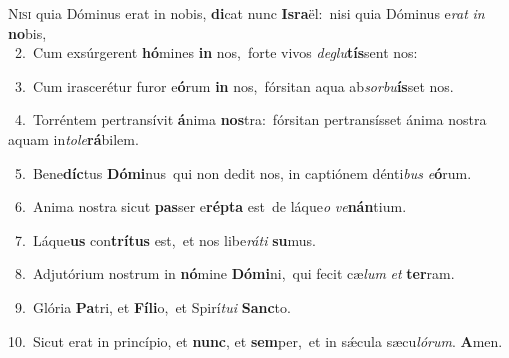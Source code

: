 \lettrine{\initial\textcolor{\initialcolor}{N}}{isi} quia Dóminus erat in nobis, \textbf{di}\-cat nunc \textbf{Is}\-\textbf{ra}ël:~\star nisi quia Dóminus e\textit{rat} \textit{in} \textbf{no}\-bis,\\
{\numbfont\textcolor{\numbcolor}{~2.}}~Cum exsúrgerent \textbf{hó}\-mines \textbf{in} nos,~\star forte vivos \textit{de}\-\textit{glu}\textbf{tís}sent nos:\par
{\numbfont\textcolor{\numbcolor}{~3.}}~Cum irascerétur furor e\-\textbf{ó}\-rum \textbf{in} nos,~\star fórsitan aqua ab\-\textit{sor}\-\textit{bu}\textbf{ís}set nos.\par
{\numbfont\textcolor{\numbcolor}{~4.}}~Torréntem pertransívit \textbf{á}\-nima \textbf{nos}\-tra:~\star fórsitan pertransísset ánima nostra aquam in\-\textit{to}\-\textit{le}\textbf{rá}bilem.\par
{\numbfont\textcolor{\numbcolor}{~5.}}~Bene\-\textbf{díc}\-tus \textbf{Dó}\-\textbf{mi}nus~\star qui non dedit nos, in captiónem dénti\textit{bus} \textit{e}\-\textbf{ó}rum.\par
{\numbfont\textcolor{\numbcolor}{~6.}}~Anima nostra sicut \textbf{pas}\-ser e\-\textbf{rép}\-\textbf{ta} est~\star de láque\textit{o} \textit{ve}\-\textbf{nán}tium.\par
{\numbfont\textcolor{\numbcolor}{~7.}}~Láque\textbf{us} con\-\textbf{trí}\-\textbf{tus} est,~\star et nos libe\-\textit{rá}\-\textit{ti} \textbf{su}\-mus.\par
{\numbfont\textcolor{\numbcolor}{~8.}}~Adjutórium nostrum in \textbf{nó}\-mine \textbf{Dó}\-\textbf{mi}ni,~\star qui fecit cæ\textit{lum} \textit{et} \textbf{ter}\-ram.\par
{\numbfont\textcolor{\numbcolor}{~9.}}~Glória \textbf{Pa}\-tri, et \textbf{Fí}\-\textbf{li}o,~\star et Spirí\-\textit{tu}\-\textit{i} \textbf{Sanc}\-to.\par
{\numbfont\textcolor{\numbcolor}{10.}}~Sicut erat in princípio, et \textbf{nunc}\-, et \textbf{sem}\-per,~\star et in sǽcula sæcu\-\textit{ló}\-\textit{rum}. \textbf{A}\-men.\par
